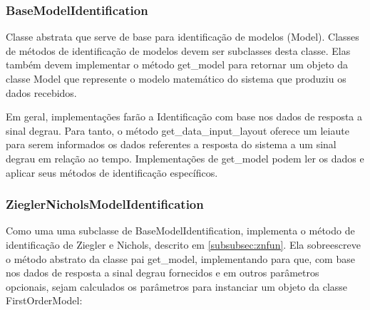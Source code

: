 \subsubsection{BaseModelIdentification}
Classe abstrata que serve de base para identificação de modelos (Model).
Classes de métodos de identificação de modelos devem ser subclasses desta classe.
Elas também devem implementar o método get\_model para retornar um objeto da classe Model que represente o modelo
matemático do sistema que produziu os dados recebidos.

Em geral, implementações farão a Identificação com base nos dados de resposta a sinal degrau.
Para tanto, o método get\_data\_input\_layout oferece um leiaute para serem informados os dados referentes a resposta
do sistema a um sinal degrau em relação ao tempo.
Implementações de get\_model podem ler os dados e aplicar seus métodos de identificação específicos.

\subsubsection{ZieglerNicholsModelIdentification}

Como uma uma subclasse de BaseModelIdentification, implementa o método de identificação de Ziegler e Nichols,
descrito em \ref{subsubsec:znfun}.
Ela sobreescreve o método abstrato da classe pai get\_model, implementando para que, com base nos dados de resposta a
sinal degrau fornecidos e em outros parâmetros opcionais, sejam calculados os parâmetros para instanciar um objeto da
classe FirstOrderModel:

